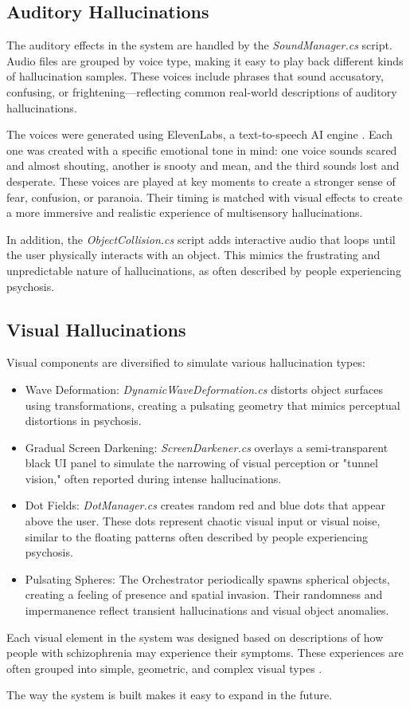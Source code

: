 \subsection{Auditory Hallucinations}

The auditory effects in the system are handled by the \textit{SoundManager.cs} script. Audio files are grouped by voice type, making it easy to play back different kinds of hallucination samples. These voices include phrases that sound accusatory, confusing, or frightening—reflecting common real-world descriptions of auditory hallucinations.
    
The voices were generated using ElevenLabs, a text-to-speech AI engine \cite{elevenlabs}. Each one was created with a specific emotional tone in mind: one voice sounds scared and almost shouting, another is snooty and mean, and the third sounds lost and desperate. These voices are played at key moments to create a stronger sense of fear, confusion, or paranoia. Their timing is matched with visual effects to create a more immersive and realistic experience of multisensory hallucinations.
    
In addition, the \textit{ObjectCollision.cs} script adds interactive audio that loops until the user physically interacts with an object. This mimics the frustrating and unpredictable nature of hallucinations, as often described by people experiencing psychosis.
    
    
\subsection{Visual Hallucinations}
Visual components are diversified to simulate various hallucination types:
\begin{itemize}
    \item Wave Deformation: \textit{DynamicWaveDeformation.cs} distorts object surfaces using transformations, creating a pulsating geometry that mimics perceptual distortions in psychosis.
    \item Gradual Screen Darkening: \textit{ScreenDarkener.cs} overlays a semi-transparent black UI panel to simulate the narrowing of visual perception or "tunnel vision," often reported during intense hallucinations.
    \item Dot Fields: \textit{DotManager.cs} creates random red and blue dots that appear above the user. These dots represent chaotic visual input or visual noise, similar to the floating patterns often described by people experiencing psychosis.
    \item Pulsating Spheres: The Orchestrator periodically spawns spherical objects, creating a feeling of presence and spatial invasion. Their randomness and impermanence reflect transient hallucinations and visual object anomalies.
\end{itemize}

Each visual element in the system was designed based on descriptions of how people with schizophrenia may experience their symptoms. These experiences are often grouped into simple, geometric, and complex visual types \cite{Silverstein2021,Vanommen2019}.

The way the system is built makes it easy to expand in the future.